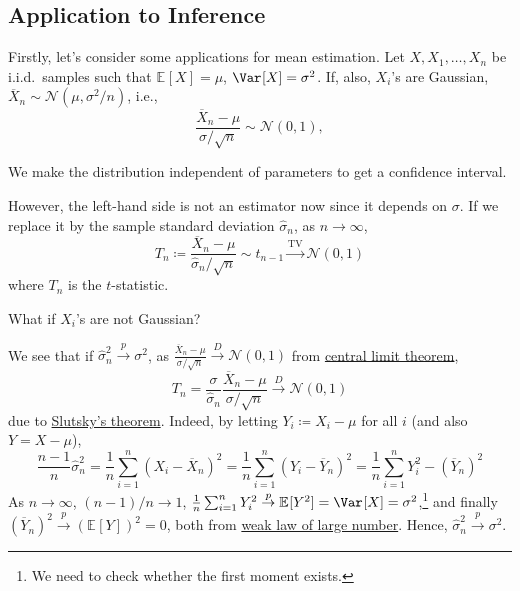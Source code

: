 \subsection{Application to Inference}
Firstly, let's consider some applications for mean estimation. Let \(X, X_1, \dots , X_n\) be i.i.d.\ samples such that \(\mathbb{E}_{}[X] = \mu \), \(\Var_{}[X] = \sigma ^2\). If, also, \(X_i\)'s are Gaussian, \(\overline{X} _n \sim \mathcal{N} (\mu , \sigma ^2 / n)\), i.e.,
\[
	\frac{\overline{X} _n - \mu }{\sigma / \sqrt{n} } \sim \mathcal{N} (0, 1),
\]

\begin{intuition}
	We make the distribution independent of parameters to get a confidence interval.
\end{intuition}

However, the left-hand side is not an estimator now since it depends on \(\sigma \). If we replace it by the sample standard deviation \(\hat{\sigma} _n\), as \(n \to \infty \),
\[
	T_n \coloneqq \frac{\overline{X} _n - \mu }{\hat{\sigma} _n / \sqrt{n} } \sim t_{n-1} \overset{\operatorname{TV}}{\to } \mathcal{N} (0, 1)
\]
where \(T_n\) is the \(t\)-statistic.

\begin{problem*}
	What if \(X_i\)'s are not Gaussian?
\end{problem*}
\begin{answer}
	We see that if \(\hat{\sigma} _n ^2 \overset{p}{\to } \sigma ^2\), as \(\frac{\overline{X} _n - \mu }{\sigma / \sqrt{n} } \overset{D}{\to} \mathcal{N} (0, 1)\) from \hyperref[thm:CLT]{central limit theorem},
	\[
		T_n
		= \frac{\sigma }{\hat{\sigma} _n} \frac{\overline{X} _n - \mu }{\sigma / \sqrt{n} }
		\overset{D}{\to} \mathcal{N} (0, 1)
	\]
	due to \hyperref[col:Slutsky]{Slutsky's theorem}. Indeed, by letting \(Y_i \coloneqq X_i - \mu \) for all \(i\) (and also \(Y = X - \mu \)),
	\[
		\frac{n-1}{n} \hat{\sigma} _n^2
		= \frac{1}{n} \sum_{i=1}^{n} \left( X_i - \overline{X} _n\right) ^2
		= \frac{1}{n} \sum_{i=1}^{n} \left( Y_i - \overline{Y} _n\right) ^2
		= \frac{1}{n} \sum_{i=1}^{n} Y_i^2 - (\overline{Y} _n)^2
	\]
	As \(n \to \infty \), \((n-1) / n \to 1\), \(\frac{1}{n} \sum_{i=1}^{n} Y_i^2 \overset{p}{\to } \mathbb{E}_{}[Y^2] = \Var_{}[X] = \sigma ^2\),\footnote{We need to check whether the first moment exists.} and finally \((\overline{Y} _n)^2 \overset{p}{\to } (\mathbb{E}_{}[Y])^2 = 0\), both from \hyperref[thm:WLLN]{weak law of large number}. Hence, \(\hat{\sigma} _n^2 \overset{p}{\to } \sigma ^2\).
\end{answer}

